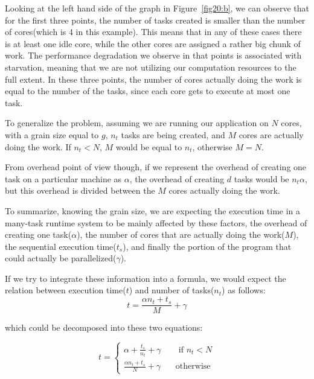 Looking at the left hand side of the graph in Figure~\ref{fig20:b}, we can observe that for the first three points, the number of tasks created is smaller than the number of cores(which is 4 in this example). This means that in any of these cases there is at least one idle core, while the other cores are assigned a rather big chunk of work. The performance degradation we observe in that points is associated with starvation, meaning that we are not utilizing our computation resources to the full extent. In these three points, the number of cores actually doing the work is equal to the number of the tasks, since each core gets to execute at most one task.    

To generalize the problem, assuming we are running our application on $N$ cores, with a grain size equal to $g$, $n_t$ tasks are being created, and $M$ cores are actually doing the work. If $n_t<N$, $M$ would be equal to $n_t$, otherwise $M=N$.


From overhead point of view though, if we represent the overhead of creating one task on a particular machine as $\alpha$, the overhead of creating $d$ tasks would be $n_t\alpha$, but this overhead is divided between the $M$ cores actually doing the work. 

To summarize, knowing the grain size, we are expecting the execution time in a many-task runtime system to be mainly affected by these factors, the overhead of creating one task($\alpha$), the number of cores that are actually doing the work($M$), the sequential execution time($t_s$), and finally the portion of the program that could actually be parallelized($\gamma$). 

If we try to integrate these information into a formula, we would expect the relation between execution time($t$) and number of tasks($n_t$) as follows:
\begin{equation}\label{new}
t=\frac{\alpha{n_t}+t_s}{M}+\gamma
\end{equation}

which could be decomposed into these two equations:

\begin{equation}
t=\left\{
\begin{aligned}
\alpha+\frac{t_s}{n_t}+\gamma  \:\:\:\:\:\:\:\:      \text{ if } n_t<N\\
\frac{\alpha{n_t}+t_s}{N}+\gamma\:\:\:\:\:\:\:\:     \text{otherwise}
\end{aligned}
\right.
\end{equation}

